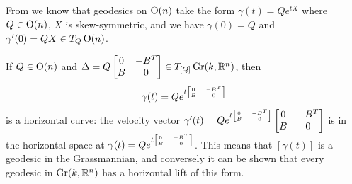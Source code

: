 From  we know that geodesics on $\operatorname{O}(n)$ take the form $\gamma(t) = Q e^{tX}$ where $Q \in \operatorname{O}(n)$, $X$ is skew-symmetric, and we have $\gamma(0) = Q$ and $\gamma'(0) = QX \in T_Q \operatorname{O}(n)$. 

If $Q \in \operatorname{O}(n)$ and $\Delta = Q\begin{bmatrix} 0 & -B^T \\ B & 0 \end{bmatrix} \in T_{[Q]}\operatorname{Gr}(k,\mathbb{R}^n)$, then 
\[
	\gamma(t) = Q e^{t{\tiny\begin{bmatrix} 0 & -B^T \\ B & 0 \end{bmatrix}}}
\]
is a horizontal curve: the velocity vector $\gamma'(t) = Q e^{t{\tiny\begin{bmatrix} 0 & -B^T \\ B & 0 \end{bmatrix}}} \begin{bmatrix} 0 & -B^T \\ B & 0 \end{bmatrix}$ is in the horizontal space at $\gamma(t) = Qe^{t {\tiny\begin{bmatrix} 0 & -B^T \\ B & 0 \end{bmatrix}}}$. This means that $[\gamma(t)]$ is a geodesic in the Grassmannian, and conversely it can be shown that every geodesic in $\operatorname{Gr}(k,\mathbb{R}^n)$ has a horizontal lift of this form.

